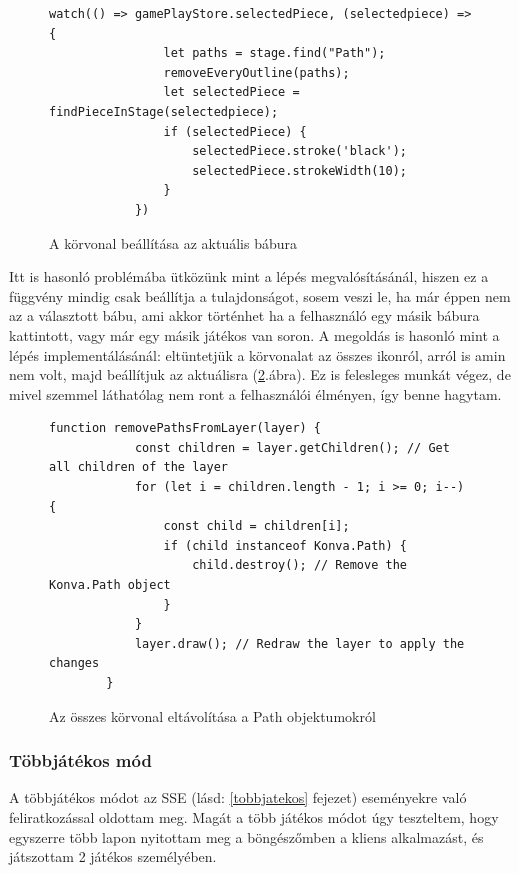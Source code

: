 \documentclass[a4paper,twoside]{article}
\begin{document}
\begin{figure}
	\caption{A körvonal beállítása az aktuális bábura}
	\begin{minipage}{\textwidth}
		\begin{lstlisting}[style=javascriptStyle]
			 watch(() => gamePlayStore.selectedPiece, (selectedpiece) => {
				let paths = stage.find("Path");
				removeEveryOutline(paths);
				let selectedPiece = findPieceInStage(selectedpiece);
				if (selectedPiece) {
					selectedPiece.stroke('black');
					selectedPiece.strokeWidth(10);
				}
			})
			\end{lstlisting}
		\end{minipage}
		
		\label{addOutline}
	\end{figure}
	\FloatBarrier

 Itt is hasonló problémába ütközünk mint a lépés megvalósításánál, hiszen ez a függvény mindig csak beállítja a tulajdonságot, sosem veszi le, ha már éppen nem az a választott bábu, ami akkor történhet ha a felhasználó egy másik bábura kattintott, vagy már egy másik játékos van soron. A megoldás is hasonló mint a lépés implementálásánál: eltüntetjük a körvonalat az összes ikonról, arról is amin nem volt, majd beállítjuk az aktuálisra (\ref{removeOutline}.ábra). Ez is felesleges munkát végez, de mivel szemmel láthatólag nem ront a felhasználói élményen, így benne hagytam. 
\begin{figure}
	\caption{Az összes körvonal eltávolítása a Path objektumokról}
	\begin{minipage}{\textwidth}
		\begin{lstlisting}[style=javascriptStyle]
		function removePathsFromLayer(layer) {
			const children = layer.getChildren(); // Get all children of the layer
			for (let i = children.length - 1; i >= 0; i--) {
				const child = children[i];
				if (child instanceof Konva.Path) {
					child.destroy(); // Remove the Konva.Path object
				}
			}
			layer.draw(); // Redraw the layer to apply the changes
		}
		\end{lstlisting}
	\end{minipage}
	
	\label{removeOutline}
\end{figure}




\subsubsection{Többjátékos mód}
A többjátékos módot az SSE (lásd: \ref{tobbjatekos} fejezet) eseményekre való feliratkozással oldottam meg. Magát a több játékos módot úgy teszteltem, hogy egyszerre több lapon nyitottam meg a böngészőmben a
kliens alkalmazást, és játszottam 2 játékos személyében. 
\end{document}
